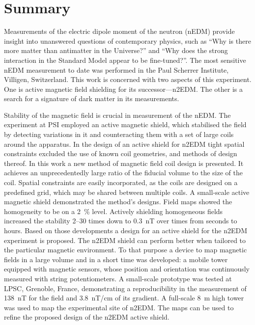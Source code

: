 

\begingroup
\let\clearpage\relax
\let\cleardoublepage\relax
\let\cleardoublepage\relax

\chapter*{Summary} %
Measurements of the electric dipole moment of the neutron (nEDM) provide insight into unanswered questions of contemporary physics, such as ``Why is there more matter than antimatter in the Universe?'' and ``Why does the strong interaction in the Standard Model appear to be fine-tuned?''.
The most sensitive nEDM measurement to date was performed in the Paul Scherrer Institute, Villigen, Switzerland.
This work is concerned with two aspects of this experiment. One is active magnetic field shielding for its successor---n2EDM\@.
The other is a search for a signature of dark matter in its measurements.

Stability of the magnetic field is crucial in measurement of the nEDM\@. The experiment at PSI employed an active magnetic shield, which stabilised the field by detecting  variations in it and counteracting them with a set of large coils around the apparatus.
In the design of an active shield for n2EDM tight spatial constraints excluded the use of known coil geometries, and methods of design thereof.
In this work a new method of magnetic field coil design is presented. It achieves an unprecedentedly large ratio of the fiducial volume to the size of the coil.
Spatial constraints are easily incorporated, as the coils are designed on a predefined grid, which may be shared between multiple coils.
A small-scale active magnetic shield demonstrated the method's designs. Field maps showed the homogeneity to be on a \SI{2}{\percent} level.
Actively shielding homogeneous fields increased the stability 2--30 times down to \SI{0.3}{nT} over times from seconds to hours.
Based on those developments a design for an active shield for the n2EDM experiment is proposed.
The n2EDM shield can perform better when tailored to the particular magnetic environment.
To that purpose a device to map magnetic fields in a large volume and in a short time was developed: a mobile tower equipped with magnetic sensors, whose position and orientation was continuously measured with string potentiometers.
A small-scale prototype was tested at LPSC, Grenoble, France, demonstrating a reproducibility in the measurement of \SI{138}{nT} for the field and \SI{3.8}{nT/cm} of its gradient.
A full-scale \SI{8}{m} high tower was used to map the experimental site of n2EDM\@.
The maps can be used to refine the proposed design of the n2EDM active shield.

